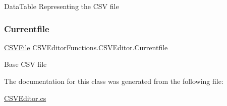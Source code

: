 Data\+Table Representing the C\+SV file 

\mbox{\label{class_c_s_v_editor_functions_1_1_c_s_v_editor_ad426611ea71bd6214812f5ddf23646b4}} 
\subsubsection{\texorpdfstring{Currentfile}{Currentfile}}
{\footnotesize\ttfamily \mbox{\hyperlink{class_c_s_v_editor_functions_1_1_c_s_v_file}{C\+S\+V\+File}} C\+S\+V\+Editor\+Functions.\+C\+S\+V\+Editor.\+Currentfile}



Base C\+SV file 



The documentation for this class was generated from the following file\+:\begin{DoxyCompactItemize}
\item 
\mbox{\hyperlink{_c_s_v_editor_8cs}{C\+S\+V\+Editor.\+cs}}\end{DoxyCompactItemize}
